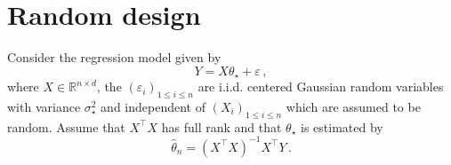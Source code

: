 \documentclass[a4paper,10pt,fleqn]{article}
\newcommand{\eqsp}{\,}
\newcommand{\rset}{\ensuremath{\mathbb{R}}}
\newcommand{\bP}{\mathbb{P}}
\newcommand{\1}{\ensuremath{\mathbbm{1}}}
\newcommand{\param}{\theta}
\begin{document}
\begin{enumerate}
%
\end{enumerate}
\section{Random design}
Consider the regression model given by
$$
Y = X\param_{\star}+ \varepsilon\eqsp,
$$
where $X\in\rset^{n\times d}$, the $(\varepsilon_{i})_{1\leqslant i \leqslant n}$ are i.i.d. centered Gaussian random variables with variance $\sigma_{\star}^2$ and independent of $(X_{i})_{1\leqslant i \leqslant n}$ which are assumed to be random. Assume that $X^\top X$ has full rank and that $\param_\star$ is estimated by 
$$
\widehat \param_n = (X^\top X)^{-1}X^\top Y\eqsp.
$$
\end{document}
